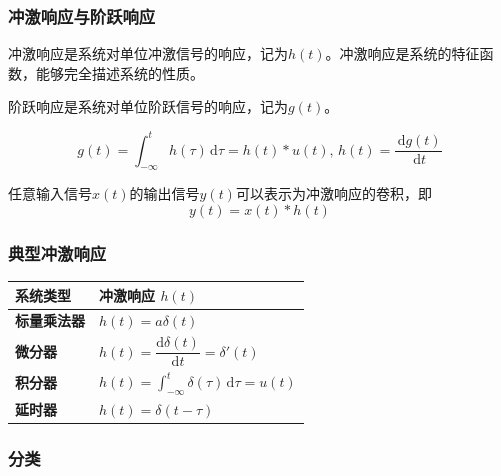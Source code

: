 \documentclass[UTF8,fontset=fandol,zihao=5]{ctexart}
\newcommand{\dd}{\,\mathrm{d}}
\begin{document}
\subsubsection{冲激响应与阶跃响应}

冲激响应是系统对单位冲激信号的响应，记为$h(t)$。冲激响应是系统的特征函数，能够完全描述系统的性质。

阶跃响应是系统对单位阶跃信号的响应，记为$g(t)$。

\begin{methodbox}[二者关系]
  \[
  g(t)=\int_{-\infty}^{t}h(\tau)\dd\tau=h(t) \ast u(t),\, h(t)=\frac{\dd g(t)}{\dd t}
  \]
\end{methodbox}

任意输入信号$x(t)$的输出信号$y(t)$可以表示为冲激响应的卷积，即
\[
y(t) = x(t) \ast h(t)
\]

\subsubsection{典型冲激响应}

\begin{center}
\begin{tabularx}{0.98\textwidth}{>{\bfseries}p{2cm}X}
\toprule
系统类型 & 冲激响应 $h(t)$ \\
\midrule
        标量乘法器 & $h(t)=a\delta(t)$ \\
        微分器 & $h(t)=\dfrac{\mathrm{d}\delta(t)}{\mathrm{d}t}=\delta'(t)$ \\
        积分器 & $h(t)=\displaystyle\int_{-\infty}^{t}\delta(\tau)\,\mathrm{d}\tau=u(t)$ \\
        延时器 & $h(t)=\delta(t-\tau)$ \\
\bottomrule
\end{tabularx}
\end{center}

\subsubsection{分类}
\end{document}
